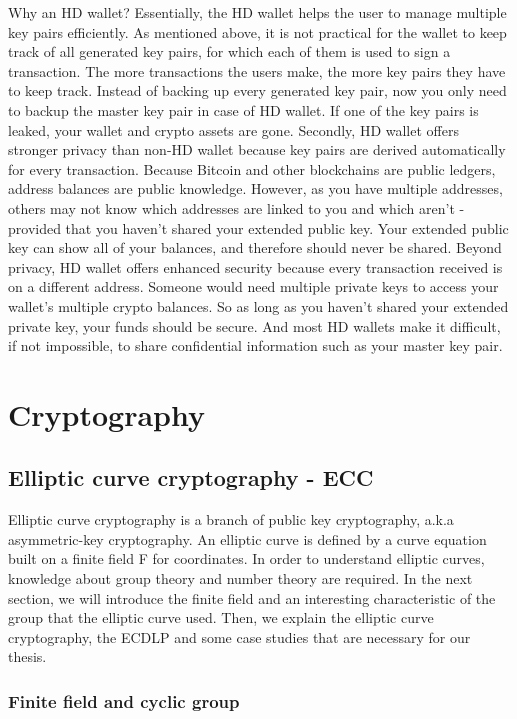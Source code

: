 Why an HD wallet? Essentially, the HD wallet helps the user to manage multiple key pairs efficiently. As mentioned above, it is not practical for the wallet to keep track of all generated key pairs, for which each of them is used to sign a transaction. The more transactions the users make, the more key pairs they have to keep track. Instead of backing up every generated key pair, now you only need to backup the master key pair in case of HD wallet. If one of the key pairs is leaked, your wallet and crypto assets are gone. Secondly,  HD wallet offers stronger privacy than non-HD wallet because key pairs are derived automatically for every transaction. Because Bitcoin and other blockchains are public ledgers, address balances are public knowledge. However, as you have multiple addresses, others may not know which addresses are linked to you and which aren’t - provided that you haven’t shared your extended public key. Your extended public key can show all of your balances, and therefore should never be shared. Beyond privacy, HD wallet offers enhanced security because every transaction received is on a different address. Someone would need multiple private keys to access your wallet’s multiple crypto balances. So as long as you haven’t shared your extended private key, your funds should be secure. And most HD wallets make it difficult, if not impossible, to share confidential information such as your master key pair.

\section{Cryptography}
\label{cryptography}

\subsection{Elliptic curve cryptography - ECC}

Elliptic curve cryptography is a branch of public key cryptography, a.k.a asymmetric-key cryptography. An elliptic curve is defined by a curve equation built on a finite field F for coordinates. In order to understand elliptic curves, knowledge about group theory and number theory are required. In the next section, we will introduce the finite field and an interesting characteristic of the group that the elliptic curve used. Then, we explain the elliptic curve cryptography, the ECDLP and some case studies that are necessary for our thesis.

\subsubsection{Finite field and cyclic group}

